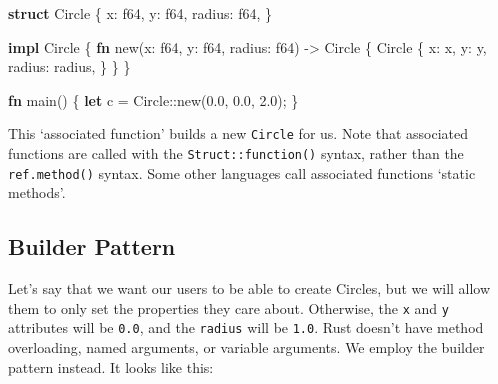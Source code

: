 \documentclass[a4paper,]{book}
\newenvironment{Shaded}{\begin{snugshade}}{\end{snugshade}}
\newcommand{\KeywordTok}[1]{\textcolor[rgb]{0.13,0.29,0.53}{\textbf{{#1}}}}
\newcommand{\DataTypeTok}[1]{\textcolor[rgb]{0.13,0.29,0.53}{{#1}}}
\newcommand{\DecValTok}[1]{\textcolor[rgb]{0.00,0.00,0.81}{{#1}}}
\newcommand{\NormalTok}[1]{{#1}}
\begin{document}
\begin{Shaded}
\begin{Highlighting}[]
\KeywordTok{struct} \NormalTok{Circle \{}
    \NormalTok{x: }\DataTypeTok{f64}\NormalTok{,}
    \NormalTok{y: }\DataTypeTok{f64}\NormalTok{,}
    \NormalTok{radius: }\DataTypeTok{f64}\NormalTok{,}
\NormalTok{\}}

\KeywordTok{impl} \NormalTok{Circle \{}
    \KeywordTok{fn} \NormalTok{new(x: }\DataTypeTok{f64}\NormalTok{, y: }\DataTypeTok{f64}\NormalTok{, radius: }\DataTypeTok{f64}\NormalTok{) -> Circle \{}
        \NormalTok{Circle \{}
            \NormalTok{x: x,}
            \NormalTok{y: y,}
            \NormalTok{radius: radius,}
        \NormalTok{\}}
    \NormalTok{\}}
\NormalTok{\}}

\KeywordTok{fn} \NormalTok{main() \{}
    \KeywordTok{let} \NormalTok{c = Circle::new(}\DecValTok{0.0}\NormalTok{, }\DecValTok{0.0}\NormalTok{, }\DecValTok{2.0}\NormalTok{);}
\NormalTok{\}}
\end{Highlighting}
\end{Shaded}

This `associated function' builds a new \texttt{Circle} for us. Note
that associated functions are called with the
\texttt{Struct::function()} syntax, rather than the
\texttt{ref.method()} syntax. Some other languages call associated
functions `static methods'.

\subsection{Builder Pattern}\label{builder-pattern}

Let's say that we want our users to be able to create Circles, but we
will allow them to only set the properties they care about. Otherwise,
the \texttt{x} and \texttt{y} attributes will be \texttt{0.0}, and the
\texttt{radius} will be \texttt{1.0}. Rust doesn't have method
overloading, named arguments, or variable arguments. We employ the
builder pattern instead. It looks like this:
\end{document}
